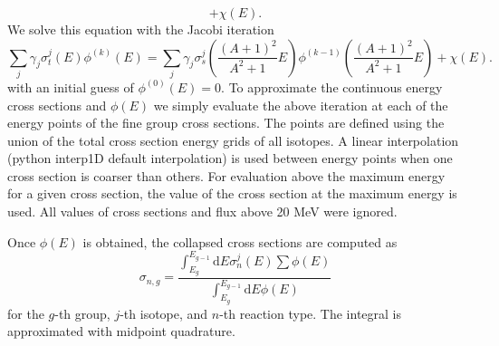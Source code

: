 \documentclass[12pt]{article}
\renewcommand{\d}{\mathrm{d}}
\newenvironment{solnum}[2][Solution]{\begin{trivlist}
\item[\hskip \labelsep {\bfseries #1}\hskip \labelsep {\bfseries #2:}]\hspace{0.3in}\newline\newline}{\end{trivlist}}
\begin{document}
\begin{solnum}{1}
\begin{equation}
   + {\chi(E)} .
\end{equation}
We solve this equation with the Jacobi iteration
\begin{equation}
    \sum_{j} \gamma_j \sigma_t^j(E) \phi^{(k)}(E) = \sum_{j} \gamma_j \sigma_s^j
    \left(\frac{(A+1)^2}{A^2+1}E\right) \phi^{(k-1)}\left(\frac{(A+1)^2}{A^2+1}E\right) 
   + {\chi(E)} .
\end{equation}
with an initial guess of $\phi^{(0)}(E)=0$.
To approximate the continuous energy cross sections and $\phi(E)$ we simply evaluate the
above iteration at each of the energy points of the fine group cross sections. The
points are defined using the union of the total cross section energy grids of all
isotopes.  A linear interpolation (python interp1D default interpolation) is used between energy points when one
cross section is coarser than others. For evaluation above the maximum energy for a
given cross section, the value of the cross section at the maximum energy is used.
All values of cross sections and flux above 20 MeV were ignored.  

Once $\phi(E)$ is obtained, the collapsed cross sections are computed as
\begin{equation}
    \sigma_{n,g} = \frac{\int_{E_g}^{E_{g-1}} \d E \sigma_n^j(E)
\sum\phi(E)}{\int_{E_g}^{E_{g-1}} \d E \phi(E)}
\end{equation}
for the $g$-th group, $j$-th isotope, and $n$-th reaction type. The integral is approximated with
midpoint quadrature.



\end{solnum}
\end{document}
